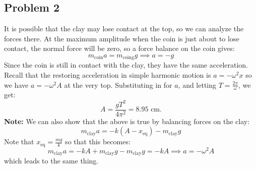 \documentclass{article}
\begin{document}
\subsection*{Problem 2}
It is possible that the clay may lose contact at the top, so we can analyze the forces there. At the maximum amplitude when the coin is just about to lose contact, the normal force will be zero, so a force balance on the coin gives:
\begin{equation}
    m_\text{coin}a = m_\text{coing}g \implies a=-g
    \label{eq:}
\end{equation}
Since the coin is still in contact with the clay, they have the same acceleration. Recall that the restoring acceleration in simple harmonic motion is $a=-\omega^2 x$ so we have $a=-\omega^2 A$ at the very top.
Substituting in for $a$, and letting $T=\frac{2\pi}{\omega}$, we get:
\begin{equation}
    A = \frac{gT^2}{4\pi^2} = 8.95\text{ cm}.
    \label{eq:}
\end{equation}
\textbf{Note:} We can also show that the above is true by balancing forces on the clay:
\begin{equation}
    m_\text{clay}a = -k(A-x_\text{eq}) - m_\text{clay}g
    \label{eq:}
\end{equation}
Note that $x_\text{eq}=\frac{mg}{k}$ so that this becomes:
\begin{equation}
    m_\text{clay}a = -kA + m_\text{clay}g - m_\text{clay}g = -kA \implies a = -\omega^2 A
    \label{eq:}
\end{equation}
which leads to the same thing.
\end{document}
